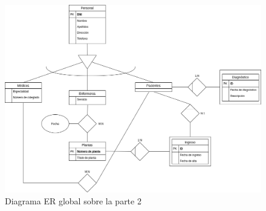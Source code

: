 \documentclass{article}
\begin{document}
\begin{landscape}
\begin{figure}
\centering
\includegraphics[scale=0.45]{images/global_parte2_practica3.png}
\caption{Diagrama ER global sobre la parte 2}
\label{fig:er_parte2_global}
\end{figure}
\end{landscape}
\end{document}
